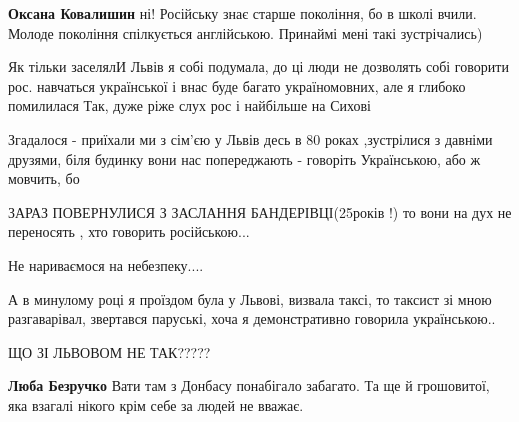 \begin{itemize}
\begin{itemize}
\textbf{Оксана Ковалишин} ні! Російську знає старше покоління, бо в школі вчили. Молоде покоління спілкується англійською. Принаймі мені такі зустрічались)
\end{itemize}

 

Як тільки заселялИ Львів я собі подумала, до ці люди не дозволять собі говорити
рос. навчаться української і внас буде багато україномовних, але я глибоко
помилилася Так, дуже ріже слух рос і найбільше на Сихові


 

Згадалося - приїхали ми з сім'єю у Львів десь в 80 роках ,зустрілися з давніми
друзями, біля будинку вони нас попереджають - говоріть Українською, або ж
мовчить, бо

ЗАРАЗ ПОВЕРНУЛИСЯ З ЗАСЛАННЯ БАНДЕРІВЦІ(25років !) то вони на дух не переносять
, хто говорить російською...

Не нариваємося на небезпеку....

А в минулому році я проїздом була у Львові, визвала таксі, то таксист зі мною
разгаварівал, звертався паруські, хоча я демонстративно говорила українською..

ЩО ЗІ ЛЬВОВОМ НЕ ТАК?????

\begin{itemize}
 
\textbf{Люба Безручко} Вати там з Донбасу понабігало забагато. Та ще й грошовитої, яка взагалі нікого крім себе за людей не вважає.

 

\end{itemize}
\end{itemize}
